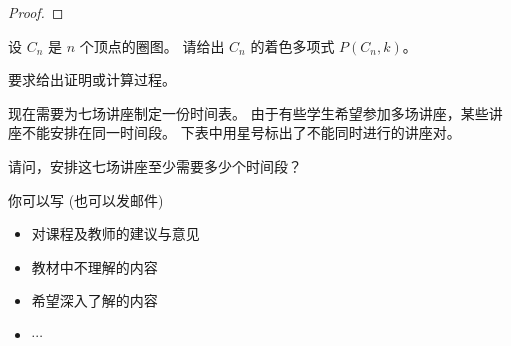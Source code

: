 \documentclass[a4paper, justified]{tufte-handout}
\begin{document}
\begin{proof}
\end{proof}

\begin{problem}[着色多项式]
  设 $C_{n}$ 是 $n$ 个顶点的圈图。
  请给出 $C_{n}$ 的着色多项式 $P(C_{n}, k)$。

  \noindent 要求给出证明或计算过程。
\end{problem}

\begin{solution}
\end{solution}

\begin{problem}[图着色的应用]
  现在需要为七场讲座制定一份时间表。
  由于有些学生希望参加多场讲座，某些讲座不能安排在同一时间段。
  下表中用星号标出了不能同时进行的讲座对。

  \noindent 请问，安排这七场讲座至少需要多少个时间段？
\end{problem}

\begin{solution}
\end{solution}


\beginfb

你可以写 (也可以发邮件)
\begin{itemize}
  \item 对课程及教师的建议与意见
  \item 教材中不理解的内容
  \item 希望深入了解的内容
  \item $\cdots$
\end{itemize}
\end{document}
